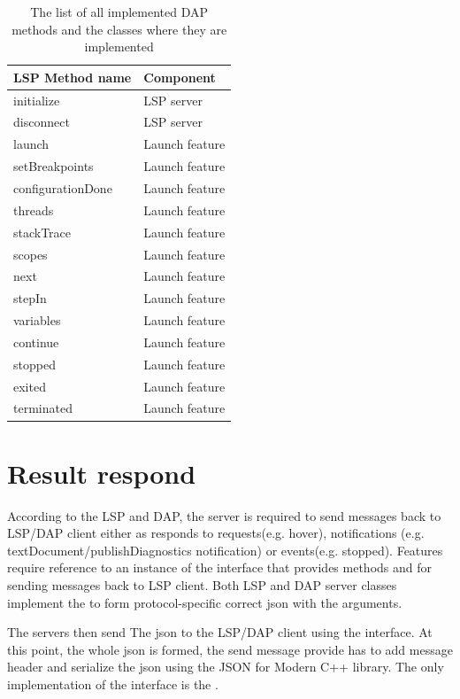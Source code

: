 \begin{longtable}{ll}
	\caption{The list of all implemented DAP methods and the classes where they are implemented}
	\label{DAP_methods}   \\ \toprule
	\textbf{LSP Method name} & \textbf{Component} \\ \midrule
	initialize  & LSP server     \\
	disconnect    & LSP server     \\
	launch & Launch feature \\
	setBreakpoints  &  Launch feature    \\
	configurationDone  & Launch feature     \\
	threads  &  Launch feature    \\
	stackTrace & Launch feature \\
	scopes  & Launch feature     \\
	next  & Launch feature     \\
	stepIn  & Launch feature     \\
	variables  & Launch feature     \\
	continue  & Launch feature \\
 stopped & Launch feature \\
 exited  & Launch feature \\
 terminated & Launch feature \\\bottomrule
\end{longtable}

\section{Result respond}

According to the LSP and DAP, the server is required to send messages back to LSP/DAP client either as responds to requests(e.g. hover), notifications (e.g. textDocument/publishDiagnostics notification) or events(e.g. stopped). Features require reference to an instance of the  interface that provides methods  and  for sending messages back to LSP client. Both LSP and DAP server classes implement the  to form protocol-specific correct json with the arguments.

The servers then send The json to the LSP/DAP client using the  interface. At this point, the whole json is formed, the send message provide has to add message header and serialize the json using the JSON for Modern C++ library. The only implementation of the  interface is the .

